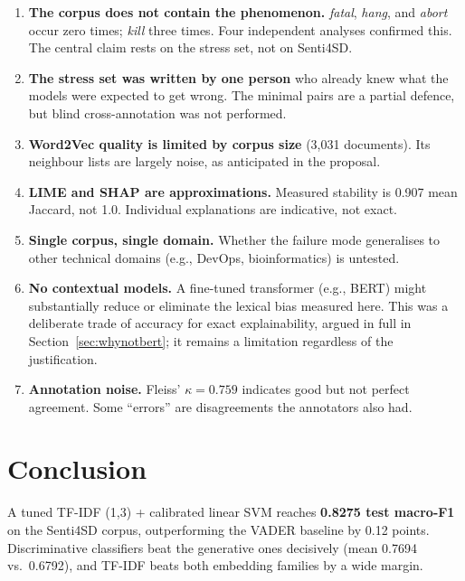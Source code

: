 \documentclass[11pt,a4paper]{article}
\begin{document}
\begin{enumerate}[leftmargin=*]
    \item \textbf{The corpus does not contain the phenomenon.} \textit{fatal}, \textit{hang}, and \textit{abort} occur zero times; \textit{kill} three times. Four independent analyses confirmed this. The central claim rests on the stress set, not on Senti4SD.

    \item \textbf{The stress set was written by one person} who already knew what the models were expected to get wrong. The minimal pairs are a partial defence, but blind cross-annotation was not performed.

    \item \textbf{Word2Vec quality is limited by corpus size} (3,031 documents). Its neighbour lists are largely noise, as anticipated in the proposal.

    \item \textbf{LIME and SHAP are approximations.} Measured stability is 0.907 mean Jaccard, not 1.0. Individual explanations are indicative, not exact.

    \item \textbf{Single corpus, single domain.} Whether the failure mode generalises to other technical domains (e.g., DevOps, bioinformatics) is untested.

    \item \textbf{No contextual models.} A fine-tuned transformer (e.g., BERT) might substantially reduce or eliminate the lexical bias measured here. This was a deliberate trade of accuracy for exact explainability, argued in full in Section~\ref{sec:whynotbert}; it remains a limitation regardless of the justification.

    \item \textbf{Annotation noise.} Fleiss' $\kappa = 0.759$ indicates good but not perfect agreement. Some ``errors'' are disagreements the annotators also had.
\end{enumerate}

\section{Conclusion}
\label{sec:conclusion}

A tuned TF-IDF (1,3) + calibrated linear SVM reaches \textbf{0.8275 test macro-F1} on the Senti4SD corpus, outperforming the VADER baseline by 0.12 points. Discriminative classifiers beat the generative ones decisively (mean 0.7694 vs.\ 0.6792), and TF-IDF beats both embedding families by a wide margin.
\end{document}
